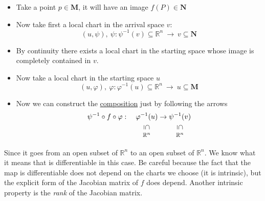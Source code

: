 \documentclass[../main.tex]{subfiles}
\begin{document}
\begin{itemize}
    \item Take a point $p\in\mathbf{M}$, it will have an image $f(P)\in\mathbf{N}$
    \item Now take first a local chart in the arrival space $v$:
    \[ (u,\psi),\ \psi: \psi^{-1}(v)\subseteq \mathbb{R}^n \ \rightarrow \ v \subseteq \mathbf{N}\]
    \item By continuity there exists a local chart in the starting space whose image is completely contained in $v$.
    \item Now take a local chart in the starting space $u$
    \[ (u,\varphi),\ \varphi: \varphi^{-1}(u)\subseteq \mathbb{R}^n \ \rightarrow \ u \subseteq \mathbf{M}\]
    \item Now we can construct the \hyperlink{map-comp}{composition} just by following the arrows
    \[
    \psi^{-1}\circ f\circ\varphi: \quad  \underset{\mathclap{\tikz \node {\rotatebox{-90}{$\subseteq$}} node [below=1ex] {\footnotesize $\mathbb{R}^n$};}}{\varphi^{-1}(u)} \to\underset{\mathclap{\tikz \node {\rotatebox{-90}{$\subseteq$}} node [below=1ex] {\footnotesize $\mathbb{R}^n$};}}{\psi^{-1}(v)}
    \]
\end{itemize}
Since it goes from an open subset of $\mathbb{R}^n$ to an open subset of $\mathbb{R}^n$. We know what it means that is differentiable in this case. Be careful because the fact that the map is differentiable does not depend on the charts we choose (it is intrinsic), but the explicit form of the Jacobian matrix of $f$ does depend. Another intrinsic property is the \textit{rank} of the Jacobian matrix.
\end{document}
